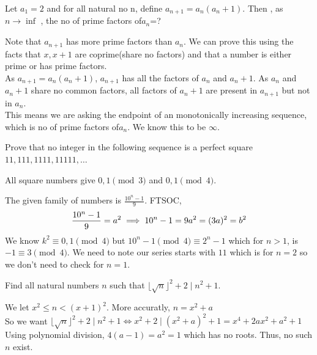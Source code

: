 \begin{N}
    Let $a_1=2$ and for all natural no n, define $a_{n+1}=a_n(a_n+1)$. Then , as $n\to \inf$ , the no of prime factors of$a_n$=?
\end{N}
\begin{solution}
    Note that $a_{n+1}$ has more prime factors than $a_n$. We can prove this using the facts that $x, x+1$ are coprime(share no factors) and that a number is either prime or has prime factors.\\
    As $a_{n+1}=a_n(a_n+1)$, $a_{n+1}$ has all the factors of $a_n$ and $a_n+1$. As $a_n$ and $a_n+1$ share no common factors, all factors of $a_n+1$ are present in $a_{n+1}$ but not in $a_{n}$.\\
    This means we are asking the endpoint of an monotonically increasing sequence, which is no of prime factors of$a_n$. We know this to be $\infty$.\\
\end{solution}
\begin{N}
Prove that no integer in the following sequence is a perfect square $11,111,1111,11111,\dots$
\end{N}
\begin{idea}
    All square numbers give $0,1 \pmod{3}$ and $0,1 \pmod 4$.\\
\end{idea}
\begin{solution}
    The given family of numbers is $\frac{10^n-1}{9}$. FTSOC,\\
    \begin{equation*}
        \frac{10^n-1}{9}=a^2\\
        \implies 10^n-1=9a^2=(3a)^2=b^2
    \end{equation*}
    We know $k^2 \equiv 0,1 \pmod 4$ but $10^n-1 \pmod{4} \equiv 2^n-1$ which for $n > 1$, is $-1 \equiv 3 \pmod{4}$. We need to note our series starts with $11$ which is for $n=2$ so we don't need to check for $n=1$.
\end{solution}
\begin{A}
Find all natural numbers $n$ such that $\lfloor\sqrt{n}\rfloor^2+2\mid n^2+1$.
\end{A}
\begin{solution}
    We let $x^2\leq n<(x+1)^2$. More accuratly, $n= x^2+a$\\
    So we want $\lfloor\sqrt{n}\rfloor^2+2\mid n^2+1 \iff x^2+2 \mid (x^2+a)^2 + 1 = x^4 + 2ax^2+a^2+1$\\
    Using polynomial division, $4(a-1)=a^2=1$ which has no roots. Thus, no such $n$ exist.\\
\end{solution}
